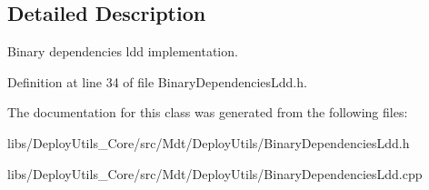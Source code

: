 \subsection{Detailed Description}
Binary dependencies ldd implementation. 

Definition at line 34 of file Binary\+Dependencies\+Ldd.\+h.



The documentation for this class was generated from the following files\+:\begin{DoxyCompactItemize}
\item 
libs/\+Deploy\+Utils\+\_\+\+Core/src/\+Mdt/\+Deploy\+Utils/Binary\+Dependencies\+Ldd.\+h\item 
libs/\+Deploy\+Utils\+\_\+\+Core/src/\+Mdt/\+Deploy\+Utils/Binary\+Dependencies\+Ldd.\+cpp\end{DoxyCompactItemize}

